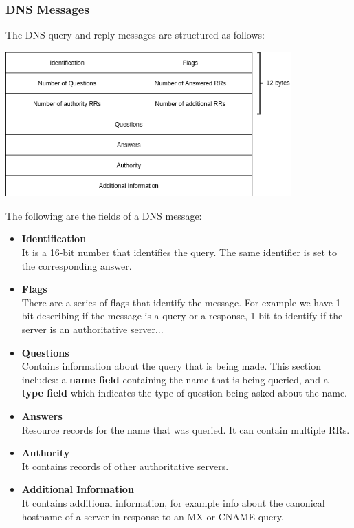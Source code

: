 \documentclass{article}
\begin{document}
\subsubsection{DNS Messages}
The DNS query and reply messages are structured as follows:
\vspace{.5cm}

\centerline{\includegraphics[width=11cm]{./assets/dns_message.png}}
\vspace{.5cm}
\noindent The following are the fields of a DNS message:

\begin{itemize}
	\item \textbf{Identification}
	\vspace{.2cm} \\
	It is a 16-bit number that identifies the query. The same identifier is set to the corresponding answer.
	
	\item \textbf{Flags}
	\vspace{.2cm} \\
	There are a series of flags that identify the message. For example we have 1 bit describing if the message is a query or a response, 1 bit to identify if the server is an authoritative server...
	
	\item \textbf{Questions}
	\vspace{.2cm} \\
	Contains information about the query that is being made. This section includes: a \textbf{name field} containing the name that is being queried, and a \textbf{type field} which indicates the type of question being asked about the name.
	
	\item \textbf{Answers}
	\vspace{.2cm} \\
	Resource records for the name that was queried. It can contain multiple RRs.
	
	\item \textbf{Authority}
	\vspace{.2cm} \\
	It contains records of other authoritative servers.
	
	\item \textbf{Additional Information}
	\vspace{.2cm} \\
	It contains additional information, for example info about the canonical hostname of a server in response to an MX or CNAME query.
\end{itemize}
\end{document}
